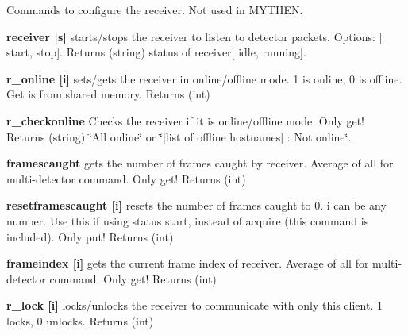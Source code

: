 Commands to configure the receiver. Not used in MYTHEN.


\begin{DoxyItemize}
\item {\bfseries receiver \mbox{[}s\mbox{]}} starts/stops the receiver to listen to detector packets. Options: \mbox{[} {\ttfamily start}, {\ttfamily stop}\mbox{]}. {\ttfamily Returns} {\ttfamily }(string) status of receiver\mbox{[} {\ttfamily idle}, {\ttfamily running}\mbox{]}.
\end{DoxyItemize}


\begin{DoxyItemize}
\item {\bfseries r\_\-online \mbox{[}i\mbox{]}} sets/gets the receiver in online/offline mode. 1 is online, 0 is offline. Get is from shared memory. {\ttfamily Returns} {\ttfamily }(int)
\end{DoxyItemize}


\begin{DoxyItemize}
\item {\bfseries r\_\-checkonline} Checks the receiver if it is online/offline mode. Only get! {\ttfamily Returns} (string) \char`\"{}All online\char`\"{} or \char`\"{}\mbox{[}list of offline hostnames\mbox{]} : Not online\char`\"{}.
\end{DoxyItemize}


\begin{DoxyItemize}
\item {\bfseries framescaught} gets the number of frames caught by receiver. Average of all for multi-\/detector command. Only get! {\ttfamily Returns} {\ttfamily }(int)
\end{DoxyItemize}


\begin{DoxyItemize}
\item {\bfseries resetframescaught \mbox{[}i\mbox{]}} resets the number of frames caught to 0. i can be any number. Use this if using status start, instead of acquire (this command is included). Only put! {\ttfamily Returns} {\ttfamily }(int)
\end{DoxyItemize}


\begin{DoxyItemize}
\item {\bfseries frameindex \mbox{[}i\mbox{]}} gets the current frame index of receiver. Average of all for multi-\/detector command. Only get! {\ttfamily Returns} {\ttfamily }(int)
\end{DoxyItemize}


\begin{DoxyItemize}
\item {\bfseries r\_\-lock \mbox{[}i\mbox{]}} locks/unlocks the receiver to communicate with only this client. 1 locks, 0 unlocks. {\ttfamily Returns} {\ttfamily }(int)
\end{DoxyItemize}


